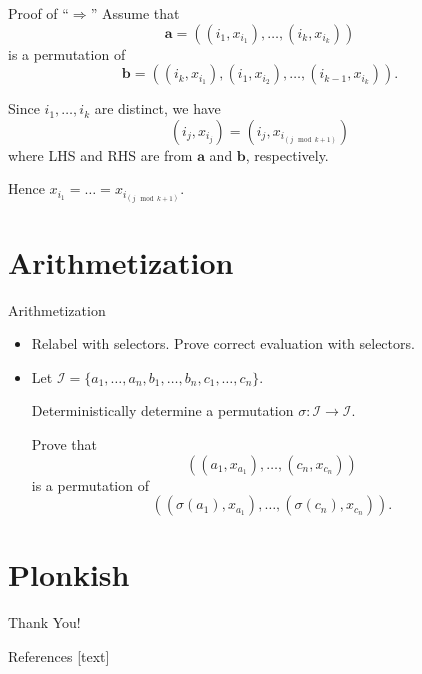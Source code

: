 \documentclass{beamer}
\newcommand{\wireindices}{\mathcal{I}}
\begin{document}
	\begin{frame}{Proof of ``$\Rightarrow$''}
		Assume that 
			\begin{equation*}
			\mathbf{a} = \left((i_1, x_{i_1}), \dots, (i_k, x_{i_k})\right)
		\end{equation*}
		is a permutation of 
		\begin{equation*}
			\mathbf{b} = \left((i_k, x_{i_1}), (i_1, x_{i_2}), \dots, (i_{k - 1}, x_{i_k})\right).
		\end{equation*}
	
		Since $i_1, \dots, i_k$ are distinct, we have
		\begin{equation*}
			(i_j, x_{i_j}) = (i_j, x_{i_{(j \mod k + 1)}})
		\end{equation*}
		where LHS and RHS are from $\mathbf{a}$ and $\mathbf{b}$, respectively.
		
		Hence $x_{i_1} = \dots = x_{i_{(j \mod k + 1)}}$.
	\end{frame}

	\section{Arithmetization}
	\begin{frame}{Arithmetization}
		\begin{itemize}
			\item Relabel with selectors. Prove correct evaluation with selectors.
			\item Let $\wireindices = \{a_1, \dots, a_n, b_1, \dots, b_n, c_1, \dots, c_n\}$. 
			
			Deterministically determine a permutation $\sigma : \wireindices \to \wireindices$. 
			
			Prove that
			\begin{equation*}
				\left((a_1, x_{a_1}), \dots, (c_n, x_{c_n})\right)
			\end{equation*}
			is a permutation of 
			\begin{equation*}
				\left((\sigma(a_1), x_{a_1}), \dots, (\sigma(c_n), x_{c_n})\right).
			\end{equation*}
		\end{itemize}
	\end{frame}

	\section{Plonkish}

	\begin{frame}{}
		\begin{center}
			{\fontsize{20}{20}\selectfont Thank You!}
		\end{center}
	\end{frame}

	\begin{frame}[allowframebreaks]{References}
		
		
		
	\end{frame}
	
\end{document}
